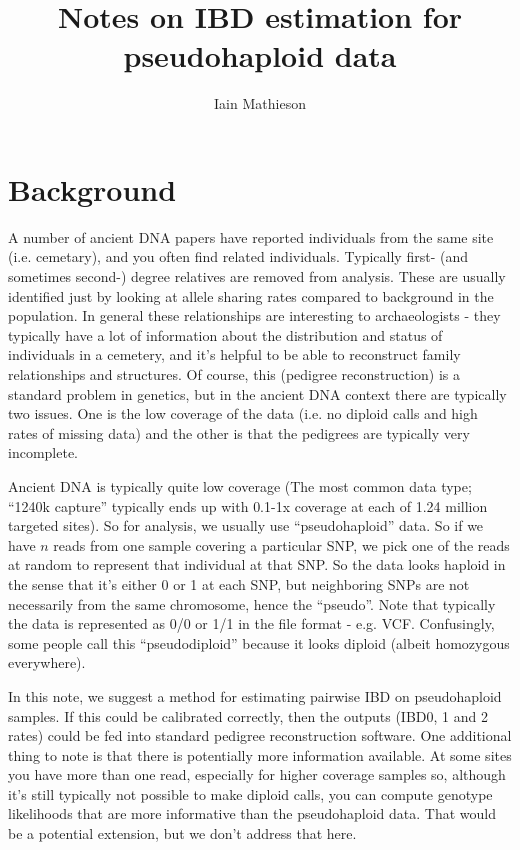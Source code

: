\documentclass[10pt,a4]{article}
\title{Notes on IBD estimation for pseudohaploid data}
\author{Iain Mathieson}
\begin{document}
\maketitle

\section{Background}

A number of ancient DNA papers have reported individuals from the same site (i.e. cemetary), and you often find related individuals. Typically first- (and sometimes second-) degree relatives are removed from analysis. These are usually identified just by looking at allele sharing rates compared to background in the population. In general these relationships are interesting to archaeologists - they typically have a lot of information about the distribution and status of individuals in a cemetery, and it's helpful to be able to reconstruct family relationships and structures. Of course, this (pedigree reconstruction) is a standard problem in genetics, but in the ancient DNA context there are typically two issues. One is the low coverage of the data (i.e. no diploid calls and high rates of missing data) and the other is that the pedigrees are typically very incomplete. 

Ancient DNA is typically quite low coverage (The most common data type; ``1240k capture'' typically ends up with 0.1-1x coverage at each of 1.24 million targeted sites). So for analysis, we usually use ``pseudohaploid'' data. So if we have $n$ reads from one sample covering a particular SNP, we pick one of the reads at random to represent that individual at that SNP. So the data looks haploid in the sense that it's either 0 or 1 at each SNP, but neighboring SNPs are not necessarily from the same chromosome, hence the ``pseudo''. Note that typically the data is represented as 0/0 or 1/1 in the file format - e.g. VCF. Confusingly, some people call this ``pseudodiploid'' because it looks diploid (albeit homozygous everywhere).

In this note, we suggest a method for estimating pairwise IBD on pseudohaploid samples. If this could be calibrated correctly, then the outputs (IBD0, 1 and 2 rates) could be fed into standard pedigree reconstruction software. One additional thing to note is that there is potentially more information available. At some sites you have more than one read, especially for higher coverage samples so, although it's still typically not possible to make diploid calls, you can compute genotype likelihoods that are more informative than the pseudohaploid data. That would be a potential extension, but we don't address that here.
\end{document}
